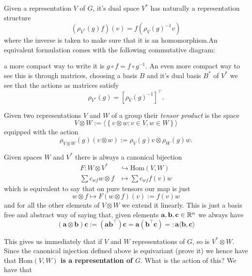 \documentclass[11pt]{scrartcl}
\newcommand{\inj}{\hookrightarrow}
\begin{document}
	\begin{example}
		Given a representation $V$ of $G$, it's dual space $V^*$ has naturally a representation structure
		$$\left(\rho_{V^*}(g)f\right)(v)=f\left(\rho_V(g)^{-1}v\right)$$
		where the inverse is taken to make sure that it is an homomorphism.An equivalent formulation comes with the following commutative diagram:
		\begin{center}
		\end{center}
		a more compact way to write it is $g\circ f = f\circ g^{-1}$. An even more compact way to see this is through matrices, choosing a basis $B$ and it's dual basis $B^*$ of $V^*$ we see that the actions as matrices satisfy
		$$\rho_{V^*}(g)=\left[\rho_V(g)^{-1}\right]^\intercal.$$
	\end{example}
	\begin{definition}
		Given two representations $V$ and $W$ of a group their \textit{tensor product} is the space 
		$$V\otimes W := \langle \left\{v \otimes w: v\in V,w\in W\right\}\rangle$$
		equipped with the action 
		$$\rho_{V\otimes W}(g)(v\otimes w):=\rho_V(g)v\otimes \rho_W(g)w.$$
	\end{definition}
	\begin{remark}
		Given spaces $W$ and $V^*$ there is always a canonical bijection
		\begin{align*}
			F: W\otimes V^* & \inj \text{Hom}(V,W) \\
			\sum c_{wf}w\otimes f & \mapsto \sum c_{wf} f(v)w
		\end{align*}
		which is equivalent to say that on pure tensors our map is just 
		$$w\otimes f \mapsto F(w\otimes f)(v):=f(v)w$$
		and for all the other elements of $V\otimes W$ we extend it linearly. This is just a basis free and abstract way of saying that, given elements $\mathbf{a},\mathbf{b},\mathbf{c}\in\mathbb R^n$ we always have
		$$\left(\mathbf{a}\otimes \mathbf{b}\right)\mathbf{c}:=\left(\mathbf{a}\mathbf{b}^\intercal\right) \mathbf{c}=\mathbf{a}\left(\mathbf{b}^\intercal \mathbf{c}\right)=:\mathbf{a}\langle \mathbf{b},\mathbf{c}\rangle$$  
	\end{remark}
	This gives us immediately that if $V$ and $W$ representations of $G$, so is $V^*\otimes W$. Since the canonical injection defined above is equivariant (prove it) we hence have that \textbf{$\text{Hom}(V,W)$ is a representation of $G$}. What is the action of this? We have that
\end{document}

